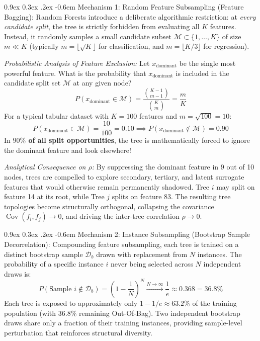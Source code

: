 \documentclass[11pt,a4paper]{article}
\makeatletter
\renewcommand\paragraph{\@startsection{paragraph}{4}{\z@}%
                                     {0.9ex \@plus0.3ex \@minus.2ex}%
                                     {-0.6em}%
                                     {\normalfont\normalsize\bfseries}}
\newcommand{\Cov}{\operatorname{Cov}}
\makeatother
\begin{document}
\paragraph{Mechanism 1: Random Feature Subsampling (Feature Bagging):}
Random Forests introduce a deliberate algorithmic restriction: at \emph{every candidate split}, the tree is strictly forbidden from evaluating all $K$ features. Instead, it randomly samples a small candidate subset $\mathcal{M} \subset \{1, \dots, K\}$ of size $m \ll K$ (typically $m = \lfloor \sqrt{K} \rfloor$ for classification, and $m = \lfloor K/3 \rfloor$ for regression).

\emph{Probabilistic Analysis of Feature Exclusion:}
Let $x_{\text{dominant}}$ be the single most powerful feature. What is the probability that $x_{\text{dominant}}$ is included in the candidate split set $\mathcal{M}$ at any given node?
\begin{equation}
    P(x_{\text{dominant}} \in \mathcal{M}) = \frac{\binom{K-1}{m-1}}{\binom{K}{m}} = \frac{m}{K}
\end{equation}
For a typical tabular dataset with $K = 100$ features and $m = \sqrt{100} = 10$:
\begin{equation}
    P(x_{\text{dominant}} \in \mathcal{M}) = \frac{10}{100} = 0.10 \implies P(x_{\text{dominant}} \notin \mathcal{M}) = 0.90
\end{equation}
In \textbf{$90\%$ of all split opportunities}, the tree is mathematically forced to ignore the dominant feature and look elsewhere! 

\emph{Analytical Consequence on $\rho$:}
By suppressing the dominant feature in 9 out of 10 nodes, trees are compelled to explore secondary, tertiary, and latent surrogate features that would otherwise remain permanently shadowed. Tree $i$ may split on feature 14 at its root, while Tree $j$ splits on feature 83. The resulting tree topologies become structurally orthogonal, collapsing the covariance $\Cov(f_i, f_j) \to 0$, and driving the inter-tree correlation $\rho \to 0$.

\paragraph{Mechanism 2: Instance Subsampling (Bootstrap Sample Decorrelation):}
Compounding feature subsampling, each tree is trained on a distinct bootstrap sample $\mathcal{D}_b$ drawn with replacement from $N$ instances. 
The probability of a specific instance $i$ never being selected across $N$ independent draws is:
\begin{equation}
    P(\text{Sample } i \notin \mathcal{D}_b) = \left( 1 - \frac{1}{N} \right)^N \xrightarrow{N \to \infty} \frac{1}{e} \approx 0.368 = 36.8\%
\end{equation}
Each tree is exposed to approximately only $1 - 1/e \approx 63.2\%$ of the training population (with $36.8\%$ remaining Out-Of-Bag). Two independent bootstrap draws share only a fraction of their training instances, providing sample-level perturbation that reinforces structural diversity.
\end{document}
